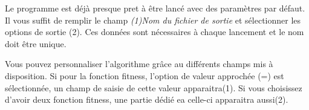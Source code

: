 \documentclass[a4paper,11pt]{article}
\begin{document}
\begin{figure}
\begin{center}
  \end{center}
      \vspace{-1cm}
  \begin{center}
  \end{center}
      \vspace{-1cm}
  \begin{center}
  \end{center}
\end{figure}
Le programme est déjà presque pret à être lancé avec des paramètres par défaut. Il vous suffit de remplir le champ \textit{(1)Nom du fichier de sortie} et sélectionner les options de sortie (2). Ces données sont nécessaires à chaque lancement et le nom doit être unique. \\
\vspace{0.6cm}

Vous pouvez personnaliser l'algorithme grâce au différents champs mis à disposition. Si pour la fonction fitness, l'option de valeur approchée (=) est sélectionnée, un champ de saisie de cette valeur apparaitra(1).
Si vous choisissez d'avoir deux fonction fitness, une partie dédié ea celle-ci apparaitra aussi(2).\\
\end{document}
